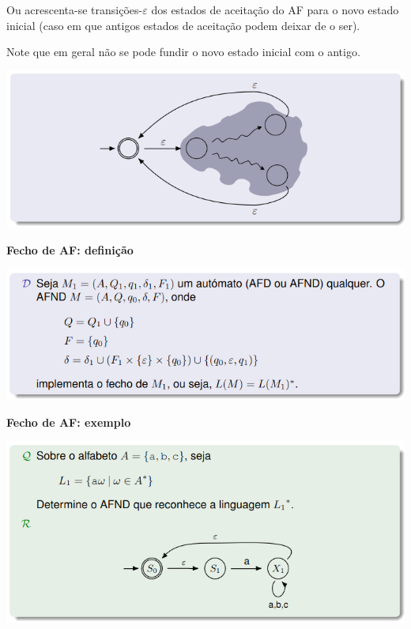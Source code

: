 \documentclass{article}
\begin{document}
\begin{flushleft}
  \begin{center}
    Ou acrescenta-se transições-$\varepsilon$ dos estados de aceitação do AF para o novo estado inicial
    (caso em que antigos estados de aceitação podem deixar de o ser).

    Note que em geral não se pode fundir o novo estado inicial com o antigo.

    \includegraphics[scale=0.4]{69}
  \end{center}

  \textbf{Fecho de AF: definição}

  \begin{center}
    \includegraphics[scale=0.4]{70}
  \end{center}

  \pagebreak

  \textbf{Fecho de AF: exemplo}

  \begin{center}
    \includegraphics[scale=0.4]{71}
  \end{center}
  \vspace{5mm}


\end{flushleft}
\end{document}
